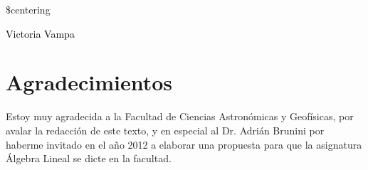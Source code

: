 \documentclass[a4paper,12pt,twopage]{book}
\begin{document}


\begingroup
\thispagestyle{empty}
\$centering
\vspace*{11.3cm}
\par\normalfont\fontsize{35}{35}\sffamily\selectfont

\newpage
\begin{center}
    \textbf{\textsc{\color{Blue} \mytitle}}   %
    
    
   \color{black}\par %
    
    \vspace*{4 cm}
\begin{Huge}
 \textcolor{black}{Victoria Vampa}\\
\end{Huge}
\end{center}

\endgroup




\chapter*{Agradecimientos}
Estoy muy agradecida a la Facultad de Ciencias Astronómicas y Geofísicas, por avalar la redacción de este texto,  y en especial al Dr. Adrián Brunini por haberme invitado en el año 2012 a elaborar una propuesta para que la asignatura Álgebra Lineal se dicte en la facultad.
\end{document}
